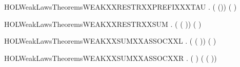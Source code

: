 \newcommand{\HOLWeakLawsTheoremsWEAKXXRESTRXXPREFIXXXLABEL}{\UseVerbatim{HOLWeakLawsTheoremsWEAKXXRESTRXXPREFIXXXLABEL}}
\begin{SaveVerbatim}{HOLWeakLawsTheoremsWEAKXXRESTRXXPREFIXXXTAU}
\HOLTokenTurnstile{} \HOLSymConst{\HOLTokenForall{}} .  (\HOLConst{\ensuremath{\nu}}  (\HOLConst{\ensuremath{\tau}})) (\HOLConst{\ensuremath{\tau}}\HOLConst{\ensuremath{\nu}}  )
\end{SaveVerbatim}
\newcommand{\HOLWeakLawsTheoremsWEAKXXRESTRXXPREFIXXXTAU}{\UseVerbatim{HOLWeakLawsTheoremsWEAKXXRESTRXXPREFIXXXTAU}}
\begin{SaveVerbatim}{HOLWeakLawsTheoremsWEAKXXRESTRXXSUM}
\HOLTokenTurnstile{} \HOLSymConst{\HOLTokenForall{}}  .  (\HOLConst{\ensuremath{\nu}}  ( \HOLSymConst{\ensuremath{+}} )) (\HOLConst{\ensuremath{\nu}}   \HOLSymConst{\ensuremath{+}} \HOLConst{\ensuremath{\nu}}  )
\end{SaveVerbatim}
\newcommand{\HOLWeakLawsTheoremsWEAKXXRESTRXXSUM}{\UseVerbatim{HOLWeakLawsTheoremsWEAKXXRESTRXXSUM}}
\begin{SaveVerbatim}{HOLWeakLawsTheoremsWEAKXXSUMXXASSOCXXL}
\HOLTokenTurnstile{} \HOLSymConst{\HOLTokenForall{}}  .  ( \HOLSymConst{\ensuremath{+}} ( \HOLSymConst{\ensuremath{+}} )) ( \HOLSymConst{\ensuremath{+}}  \HOLSymConst{\ensuremath{+}} )
\end{SaveVerbatim}
\newcommand{\HOLWeakLawsTheoremsWEAKXXSUMXXASSOCXXL}{\UseVerbatim{HOLWeakLawsTheoremsWEAKXXSUMXXASSOCXXL}}
\begin{SaveVerbatim}{HOLWeakLawsTheoremsWEAKXXSUMXXASSOCXXR}
\HOLTokenTurnstile{} \HOLSymConst{\HOLTokenForall{}}  .  ( \HOLSymConst{\ensuremath{+}}  \HOLSymConst{\ensuremath{+}} ) ( \HOLSymConst{\ensuremath{+}} ( \HOLSymConst{\ensuremath{+}} ))
\end{SaveVerbatim}
